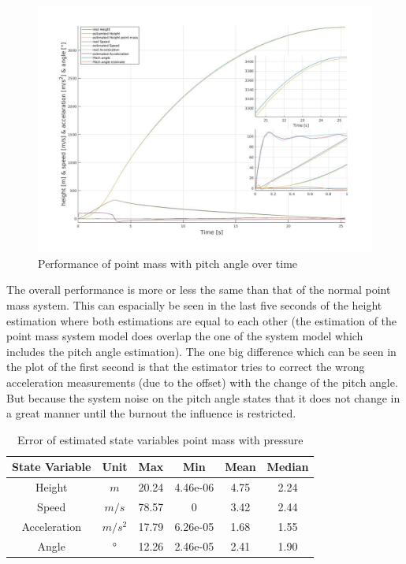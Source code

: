\begin{figure}[h!]
 \centering
 \includegraphics[width=.8 \textwidth]{./Pictures/PointMassPitchAnglePerformance.jpg}
 \caption{Performance of point mass with pitch angle over time}
 \label{fig:PointMassPitchAnglePerformance}
\end{figure}

The overall performance is more or less the same than that of the normal point mass system. This can espacially be seen in the last five seconds of the height estimation where both estimations are equal to each other (the estimation of the point mass system model does overlap the one of the system model which includes the pitch angle estimation).
The one big difference which can be seen in the plot of the first second is that the estimator tries to correct the wrong acceleration measurements (due to the offset) with the change of the pitch angle.
But because the system noise on the pitch angle states that it does not change in a great manner until the burnout the influence is restricted.

\begin{table}[h!]
\centering
\begin{tabular}{cccccc}
\hline
\multicolumn{1}{|c|}{State Variable} & \multicolumn{1}{c|}{Unit} & \multicolumn{1}{c|}{Max} & \multicolumn{1}{c|}{Min} & \multicolumn{1}{c|}{Mean} & \multicolumn{1}{c|}{Median} \\ \hline
Height                            & $m$                         & 20.24                  & 4.46e-06                 & 4.75                    & 2.24                      \\
Speed                             & $m/s$                       & 78.57                   & 0                        & 3.42                   & 2.44                      \\
Acceleration                      & $m/s^2$   			& 17.79                  & 6.26e-05                 & 1.68                    & 1.55                      \\
Angle	                  	  & $°$   			& 12.26                   & 2.46e-05                 & 2.41                  & 1.90
\end{tabular}
\caption{Error of estimated state variables point mass with pressure}
\label{tab:ErrorPointMassPitchAngle}
\end{table}

